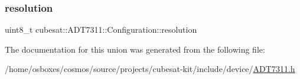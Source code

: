 \mbox{\label{unioncubesat_1_1ADT7311_1_1Configuration_a9a2f180d08ac0b67adadd3e8a7f134e8}} 
\subsubsection{\texorpdfstring{resolution}{resolution}}
{\footnotesize\ttfamily uint8\+\_\+t cubesat\+::\+A\+D\+T7311\+::\+Configuration\+::resolution}



The documentation for this union was generated from the following file\+:\begin{DoxyCompactItemize}
\item 
/home/osboxes/cosmos/source/projects/cubesat-\/kit/include/device/\hyperlink{ADT7311_8h}{A\+D\+T7311.\+h}\end{DoxyCompactItemize}
